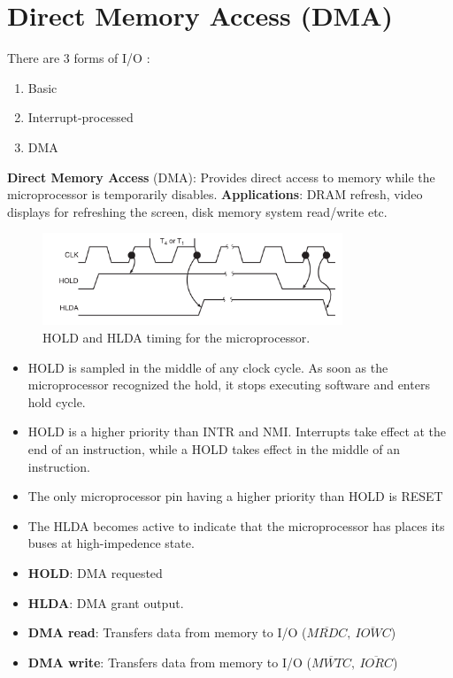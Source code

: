 \section{Direct Memory Access (DMA)}
There are 3 forms of I/O :
\begin{enumerate}
  \item Basic
  \item Interrupt-processed
  \item DMA
\end{enumerate}
\textbf{Direct Memory Access} (DMA): Provides direct access to memory while the microprocessor is temporarily disables.
\newline
\textbf{Applications}: DRAM refresh, video displays for refreshing the screen, disk memory system read/write etc.

\begin{figure}[h!]
  \includegraphics[width = 0.8\textwidth]{./figures/HOLD_HLDA.png}
  \caption{HOLD and HLDA timing for the microprocessor.}
\end{figure}

\begin{itemize}
  \item HOLD is sampled in the middle of any clock cycle. As soon as the microprocessor recognized the hold, it stops executing software and enters hold cycle.
  \item HOLD is a higher priority than INTR and NMI. Interrupts take effect at the end of an instruction, while a HOLD takes effect in the middle of an instruction.
  \item The only microprocessor pin having a higher priority than HOLD is RESET
  \item The HLDA becomes active to indicate that the microprocessor has places its buses at high-impedence state.
  \item \textbf{HOLD}: DMA requested
  \item \textbf{HLDA}: DMA grant output.
  \item \textbf{DMA read}: Transfers data from memory to I/O ($\overline{MRDC},~\overline{IOWC}$)
  \item \textbf{DMA write}: Transfers data from memory to I/O ($\overline{MWTC},~\overline{IORC}$)


\end{itemize}


